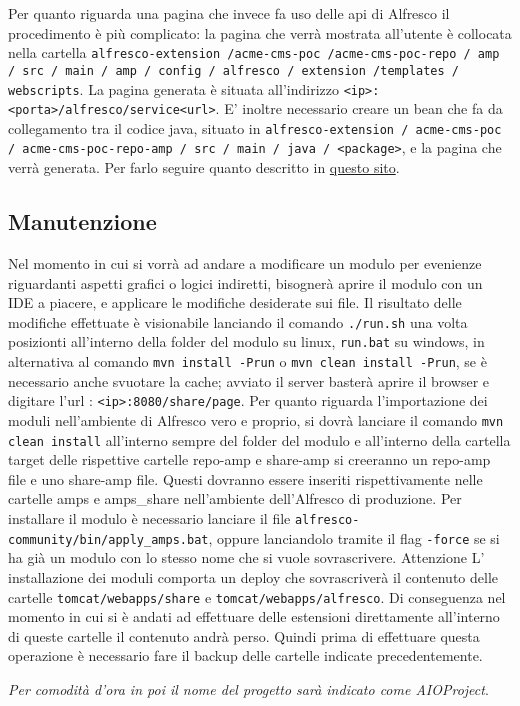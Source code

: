 Per quanto riguarda una pagina che invece fa uso delle api di Alfresco il procedimento è più complicato: la pagina che verrà mostrata all’utente è collocata nella cartella \texttt{alfresco-extension /acme-cms-poc /acme-cms-poc-repo / amp / src / main / amp / config / alfresco / extension /templates / webscripts}.
La pagina generata è situata all’indirizzo \texttt{<ip>:<porta>/alfresco/service<url>}.
E’ inoltre necessario creare un bean che fa da collegamento tra il codice java, situato in \texttt{alfresco-extension / acme-cms-poc / acme-cms-poc-repo-amp / src / main / java / <package>}, e la pagina che verrà generata. Per farlo seguire quanto descritto in \href{http://docs.alfresco.com/community/tasks/bean-config.html}{questo sito}.

\subsection{Manutenzione}
Nel momento in cui si vorrà ad andare a modificare un modulo per evenienze riguardanti aspetti grafici o logici indiretti, bisognerà aprire il modulo con un IDE a piacere, e applicare le modifiche desiderate sui file. Il risultato delle modifiche effettuate è visionabile lanciando il comando \texttt{./run.sh} una volta posizionti all’interno della folder del modulo su linux, \texttt{run.bat} su windows, in alternativa al comando \texttt{mvn install -Prun}  o  \texttt{mvn clean install -Prun}, se è necessario anche svuotare la cache; avviato il server basterà
aprire il browser e digitare l’url : \texttt{<ip>:8080/share/page}.
Per quanto riguarda l’importazione dei moduli nell'ambiente di Alfresco vero e proprio, si dovrà lanciare il comando \texttt{mvn clean install} all'interno sempre del folder del modulo e all’interno della cartella target delle rispettive cartelle repo-amp e share-amp si creeranno un repo-amp file e uno share-amp file. Questi dovranno essere inseriti rispettivamente nelle cartelle amps e amps\_share nell'ambiente dell'Alfresco di produzione.
Per installare il modulo  è necessario lanciare il file \texttt{alfresco-community/bin/apply\_amps.bat}, oppure lanciandolo tramite il flag \texttt{-force} se si ha già un modulo con lo stesso nome che si vuole sovrascrivere.
Attenzione
L’ installazione dei moduli comporta un deploy che sovrascriverà il contenuto delle cartelle
\texttt{tomcat/webapps/share} e \texttt{tomcat/webapps/alfresco}. Di conseguenza nel momento in cui si è andati ad effettuare delle estensioni direttamente all’interno di queste cartelle il contenuto andrà perso. Quindi prima di effettuare questa operazione è necessario fare il backup delle cartelle indicate precedentemente.

\emph{Per comodità d’ora in poi il nome del progetto sarà indicato come AIOProject}.